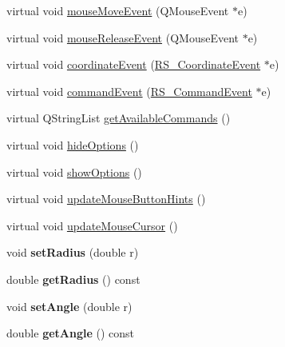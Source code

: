 \begin{DoxyCompactItemize}
\item 
virtual void \hyperlink{classRS__ActionDrawArcTangential_a352491c767eb2bd243f87a304346df31}{mouse\-Move\-Event} (Q\-Mouse\-Event $\ast$e)
\item 
virtual void \hyperlink{classRS__ActionDrawArcTangential_a5a73336d5aae1c548d6efaa8aba348ed}{mouse\-Release\-Event} (Q\-Mouse\-Event $\ast$e)
\item 
virtual void \hyperlink{classRS__ActionDrawArcTangential_ae29fb51e2f50590461ea1334c0aee083}{coordinate\-Event} (\hyperlink{classRS__CoordinateEvent}{R\-S\-\_\-\-Coordinate\-Event} $\ast$e)
\item 
virtual void \hyperlink{classRS__ActionDrawArcTangential_a19258f5fdadac5b09fa9e3abb83d56ee}{command\-Event} (\hyperlink{classRS__CommandEvent}{R\-S\-\_\-\-Command\-Event} $\ast$e)
\item 
virtual Q\-String\-List \hyperlink{classRS__ActionDrawArcTangential_a4936ccf4d81b1c335952f984bb1730d8}{get\-Available\-Commands} ()
\item 
virtual void \hyperlink{classRS__ActionDrawArcTangential_afd569179499138cfb4a54fd63c93b837}{hide\-Options} ()
\item 
virtual void \hyperlink{classRS__ActionDrawArcTangential_a4788e952e5a383cf93a999d80bd8e1f3}{show\-Options} ()
\item 
virtual void \hyperlink{classRS__ActionDrawArcTangential_aae2fbb7eb671b5ecbc3dbfe70704155c}{update\-Mouse\-Button\-Hints} ()
\item 
virtual void \hyperlink{classRS__ActionDrawArcTangential_a5c4dd0ec0fcb01777ae65d8c78141df0}{update\-Mouse\-Cursor} ()
\item 
\hypertarget{classRS__ActionDrawArcTangential_a827f821aa6476b634859b6140225e7f6}{void {\bfseries set\-Radius} (double r)}\label{classRS__ActionDrawArcTangential_a827f821aa6476b634859b6140225e7f6}

\item 
\hypertarget{classRS__ActionDrawArcTangential_a262e1a88a5e99449658920067ce0844b}{double {\bfseries get\-Radius} () const }\label{classRS__ActionDrawArcTangential_a262e1a88a5e99449658920067ce0844b}

\item 
\hypertarget{classRS__ActionDrawArcTangential_a3ab59c7f3f8bf26eb4d4f39859406348}{void {\bfseries set\-Angle} (double r)}\label{classRS__ActionDrawArcTangential_a3ab59c7f3f8bf26eb4d4f39859406348}

\item 
\hypertarget{classRS__ActionDrawArcTangential_ad8478c97ca3d188dbb1873addec58030}{double {\bfseries get\-Angle} () const }\label{classRS__ActionDrawArcTangential_ad8478c97ca3d188dbb1873addec58030}


\end{DoxyCompactItemize}
